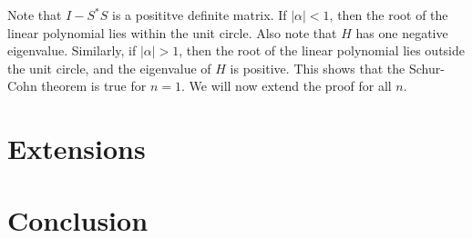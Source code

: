 \documentclass[twofold, twocolumn]{article}
\newcommand*\abs[1]{\left \vert #1 \right\vert}
\newcommand*\adj[1]{#1^*}
\theoremstyle{plain}
\theoremstyle{definition}
\begin{document}
Note that \(I - \adj{S} S\) is a posititve definite matrix. If \(\abs{\alpha} < 1\), then the root of the linear polynomial lies within the unit circle. Also note that \(H\) has one negative eigenvalue. Similarly, if \(\abs{\alpha} > 1\), then the root of the linear polynomial lies outside the unit circle, and the eigenvalue of \(H\) is positive. This shows that the Schur-Cohn theorem is true for \(n = 1\). We will now extend the proof for all \(n\). 
\section{Extensions}

\section{Conclusion}
\end{document}
